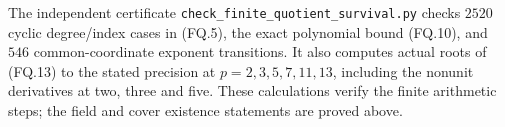 The independent certificate
\texttt{check\_finite\_quotient\_survival.py}
checks \(2520\) cyclic degree/index cases in
(FQ.5), the exact polynomial bound (FQ.10),
and \(546\) common-coordinate exponent transitions.
It also computes actual roots of (FQ.13) to
the stated precision at \(p=2,3,5,7,11,13\),
including the nonunit derivatives at two,
three and five. These calculations verify
the finite arithmetic steps; the field and
cover existence statements are proved above.
